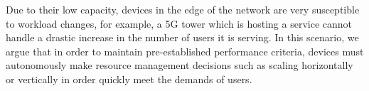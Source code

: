 Due to their low capacity, devices in the edge of the network are very susceptible to workload changes, for example, a 5G tower which is hosting a service cannot handle a drastic increase in the number of users it is serving. In this scenario, we argue that in order to maintain pre-established performance criteria, devices must autonomously make resource management decisions such as scaling horizontally or vertically in order quickly meet the demands of users.











